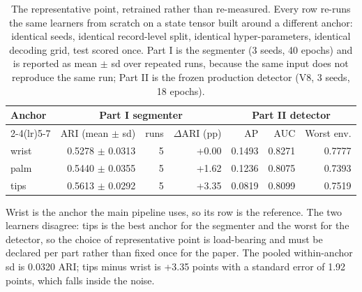 \begin{table}[H]
\centering
\caption{The representative point, retrained rather than re-measured. Every row re-runs the same learners from scratch on a state tensor built around a different anchor: identical seeds, identical record-level split, identical hyper-parameters, identical decoding grid, test scored once. Part I is the segmenter (3 seeds, 40 epochs) and is reported as mean $\pm$ sd over repeated runs, because the same input does not reproduce the same run; Part II is the frozen production detector (V8, 3 seeds, 18 epochs).}
\label{tab:p1-anchor}
\scriptsize
\begin{tabular}{lrrrrrr}
\toprule
Anchor & \multicolumn{3}{c}{Part I segmenter} & \multicolumn{3}{c}{Part II detector} \\
\cmidrule(lr){2-4}\cmidrule(lr){5-7}
 & ARI (mean $\pm$ sd) & runs & $\Delta$ARI (pp) & AP & AUC & Worst env. \\
\midrule
wrist & 0.5278 $\pm$ 0.0313 & 5 & +0.00 & 0.1493 & 0.8271 & 0.7777 \\
palm & 0.5440 $\pm$ 0.0355 & 5 & +1.62 & 0.1236 & 0.8075 & 0.7393 \\
tips & 0.5613 $\pm$ 0.0292 & 5 & +3.35 & 0.0819 & 0.8099 & 0.7519 \\
\bottomrule
\end{tabular}
\par\smallskip\footnotesize Wrist is the anchor the main pipeline uses, so its row is the reference. The two learners disagree: tips is the best anchor for the segmenter and the worst for the detector, so the choice of representative point is load-bearing and must be declared per part rather than fixed once for the paper. The pooled within-anchor sd is 0.0320 ARI; tips minus wrist is +3.35 points with a standard error of 1.92 points, which falls inside the noise.
\end{table}
